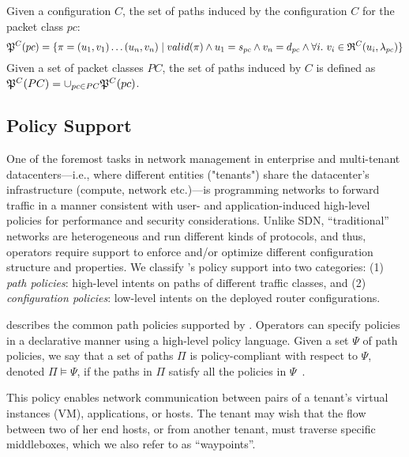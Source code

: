 \begin{definition} \label{def:inducedpaths}
Given a configuration $C$, the set of paths induced
by the configuration $C$ for the packet class $pc$:
\begin{equation*}
\mathfrak{P}^C(pc) = \{\pi=(u_1, v_1)\ldots (u_n, v_n) \mid 
valid(\pi) \wedge 
u_1 = s_{pc} \wedge v_n= d_{pc} \wedge
\forall i. ~v_i \in \mathfrak{R}^C(u_i,\lambda_{pc})\}
\end{equation*}
Given a set of packet classes $PC$, the set of paths
 induced by $C$ is defined as
$\mathfrak{P}^C(PC) = \cup_{pc\in PC} \mathfrak{P}^C(pc)$.
\end{definition}

\subsection{Policy Support} \label{sec:policy}

One of the foremost tasks in network management in enterprise 
and multi-tenant datacenters---i.e., where different entities ("tenants") share the datacenter's 
infrastructure (compute, network etc.)---is programming 
networks to forward traffic in a manner consistent with user- and
application-induced high-level policies for performance and security considerations. 
Unlike SDN, ``traditional'' networks are  heterogeneous and run different kinds of 
protocols, and thus, operators require
 support to enforce and/or optimize different
configuration  structure and properties. We 
classify \name's policy support  into two categories: 
(1) \emph{path policies}: high-level intents on paths of different traffic classes, and 
(2) \emph{configuration policies}: low-level intents on the deployed router configurations. 

  
 describes 
the common path policies 
supported by \name. 
Operators can
specify policies in a declarative manner using a high-level 
policy language. 
Given  a set $\Psi$ of
path policies, we say that
a set of paths $\Pi$ is policy-compliant with respect to $\Psi$, 
denoted  $\Pi \models \Psi$,
if the paths in $\Pi$ satisfy all the policies in $\Psi$~\cite{genesis}.


This policy enables network communication
between pairs of a tenant's virtual instances (VM), 
applications, or hosts.  
The tenant may wish that the flow
between two of her end hosts, or from another tenant, must traverse
specific middleboxes, which we also refer to as ``waypoints''.

